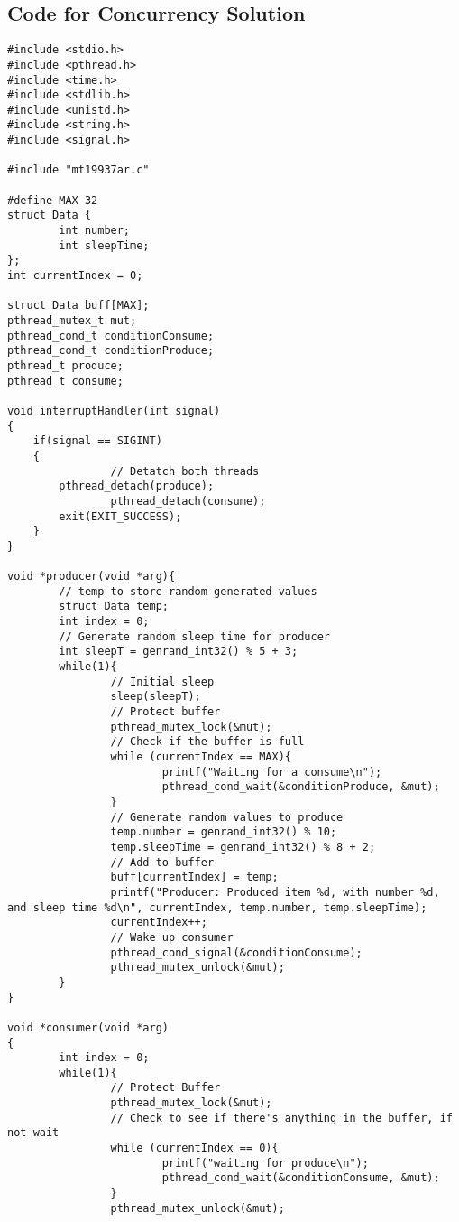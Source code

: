 \documentclass[letterpaper,10pt,titlepage,draftclsnofoot,onecolumn]{IEEEtran}
\begin{document}
\subsection{Code for Concurrency Solution}
\begin{lstlisting}
#include <stdio.h>
#include <pthread.h>
#include <time.h>
#include <stdlib.h>
#include <unistd.h>
#include <string.h>
#include <signal.h>

#include "mt19937ar.c"

#define MAX 32
struct Data {
        int number;
        int sleepTime;
};
int currentIndex = 0;

struct Data buff[MAX];
pthread_mutex_t mut;
pthread_cond_t conditionConsume;
pthread_cond_t conditionProduce;
pthread_t produce;
pthread_t consume;

void interruptHandler(int signal)
{
	if(signal == SIGINT)
	{
                // Detatch both threads
		pthread_detach(produce);
                pthread_detach(consume);
		exit(EXIT_SUCCESS);
	}
}

void *producer(void *arg){
        // temp to store random generated values
        struct Data temp;
        int index = 0;
        // Generate random sleep time for producer
        int sleepT = genrand_int32() % 5 + 3;
        while(1){
                // Initial sleep
                sleep(sleepT);
                // Protect buffer
                pthread_mutex_lock(&mut);
                // Check if the buffer is full
                while (currentIndex == MAX){
                        printf("Waiting for a consume\n");
                        pthread_cond_wait(&conditionProduce, &mut);
                }
                // Generate random values to produce
                temp.number = genrand_int32() % 10;
                temp.sleepTime = genrand_int32() % 8 + 2;
                // Add to buffer
                buff[currentIndex] = temp;
                printf("Producer: Produced item %d, with number %d, and sleep time %d\n", currentIndex, temp.number, temp.sleepTime);
                currentIndex++;
                // Wake up consumer
                pthread_cond_signal(&conditionConsume);
                pthread_mutex_unlock(&mut);
        }
}

void *consumer(void *arg)
{
        int index = 0;
        while(1){
                // Protect Buffer
                pthread_mutex_lock(&mut);
                // Check to see if there's anything in the buffer, if not wait
                while (currentIndex == 0){
                        printf("waiting for produce\n");
                        pthread_cond_wait(&conditionConsume, &mut);
                }
                pthread_mutex_unlock(&mut);


\end{lstlisting}
\end{document}
